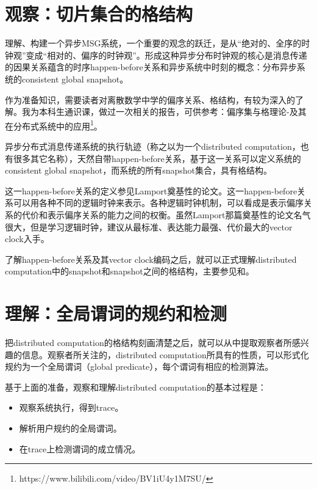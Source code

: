 \documentclass[UTF8]{ctexrep}
\begin{document}
\section{观察：切片集合的格结构}

理解、构建一个异步MSG系统，一个重要的观念的跃迁，是从“绝对的、全序的时钟观”变成“相对的、偏序的时钟观”。形成这种异步分布时钟观的核心是消息传递的因果关系蕴含的时序happen-before关系和异步系统中时刻的概念：分布异步系统的consistent global snapshot。

作为准备知识，需要读者对离散数学中学的偏序关系、格结构，有较为深入的了解。我为本科生通识课，做过一次相关的报告，可供参考：偏序集与格理论-及其在分布式系统中的应用\footnote{https://www.bilibili.com/video/BV1iU4y1M7SU/}。

异步分布式消息传递系统的执行轨迹（称之以为一个distributed computation，也有很多其它名称），天然自带happen-before关系，基于这一关系可以定义系统的consistent global snapshot，而系统的所有snapshot集合，具有格结构。

这一happen-before关系的定义参见Lamport奠基性的论文\cite{Lamport78}。这一happen-before关系可以用各种不同的逻辑时钟来表示。各种逻辑时钟机制，可以看成是表示偏序关系的代价和表示偏序关系的能力之间的权衡。虽然Lamport那篇奠基性的论文名气很大，但是学习逻辑时钟，建议从最标准、表达能力最强、代价最大的vector clock入手\cite{Mattern89}。

了解happen-before关系及其vector clock编码之后，就可以正式理解distributed computation中的snapshot和snapshot之间的格结构，主要参见\cite{Mattern89}和\cite{Babaoglu93}。

\section{理解：全局谓词的规约和检测}

把distributed computation的格结构刻画清楚之后，就可以从中提取观察者所感兴趣的信息。观察者所关注的，distributed computation所具有的性质，可以形式化规约为一个全局谓词（global predicate），每个谓词有相应的检测算法。

基于上面的准备，观察和理解distributed computation的基本过程是：

\begin{itemize}
    \item 观察系统执行，得到trace。
    \item 解析用户规约的全局谓词。
    \item 在trace上检测谓词的成立情况。
\end{itemize}
\end{document}
